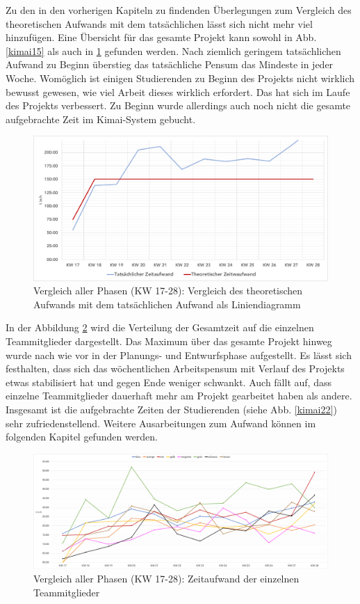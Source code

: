\documentclass[../review_3.tex]{subfiles}
\begin{document}
Zu den in den vorherigen Kapiteln zu findenden Überlegungen zum Vergleich des theoretischen Aufwands mit dem tatsächlichen lässt sich nicht mehr viel hinzufügen. Eine Übersicht für das gesamte Projekt kann sowohl in Abb. \ref{kimai15} als auch in \ref{kimai17} gefunden werden. Nach ziemlich geringem tatsächlichen Aufwand zu Beginn überstieg das tatsächliche Pensum das Mindeste in jeder Woche. Womöglich ist einigen Studierenden zu Beginn des Projekts nicht wirklich bewusst gewesen, wie viel Arbeit dieses wirklich erfordert. Das hat sich im Laufe des Projekts verbessert. Zu Beginn wurde allerdings auch noch nicht die gesamte aufgebrachte Zeit im Kimai-System gebucht.

\begin{figure} [h]
    \centering
    \includegraphics[width = \linewidth, trim=5pt 5pt 5pt 5pt, clip]{img/allephasen2.pdf}
    \caption{Vergleich aller Phasen (KW 17-28): Vergleich des theoretischen Aufwands mit dem tatsächlichen Aufwand als Liniendiagramm}
    \label{kimai17}
\end{figure}

In der Abbildung \ref{kimai16} wird die Verteilung der Gesamtzeit auf die einzelnen Teammitglieder dargestellt. Das Maximum über das gesamte Projekt hinweg wurde nach wie vor in der Planungs- und Entwurfsphase aufgestellt. Es lässt sich festhalten, dass sich das wöchentlichen Arbeitspensum mit Verlauf des Projekts etwas stabilisiert hat und gegen Ende weniger schwankt. Auch fällt auf, dass einzelne Teammitglieder dauerhaft mehr am Projekt gearbeitet haben als andere. Insgesamt ist die aufgebrachte Zeiten der Studierenden (siehe Abb. \ref{kimai22}) sehr zufriedenstellend. Weitere Ausarbeitungen zum Aufwand können im folgenden Kapitel gefunden werden.

\begin{figure} [h]
    \centering
    \includegraphics[width = \linewidth, trim=5pt 5pt 5pt 5pt, clip]{img/zeiten1.pdf}
    \caption{Vergleich aller Phasen (KW 17-28): Zeitaufwand der einzelnen Teammitglieder}
    \label{kimai16}
\end{figure}
\end{document}
